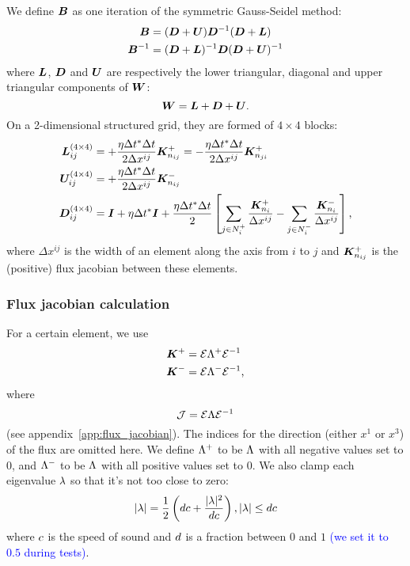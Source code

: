 \documentclass{article}
\newcommand{\todo}[1]{\textcolor{blue}{#1}}
\begin{document}
We define $\bm{B}$ as one iteration of the symmetric Gauss-Seidel method:
\begin{align}
    \bm{B}       &= (\bm{D} + \bm{U}) \bm{D}^{-1} (\bm{D} + \bm{L}) \\
    \bm{B}^{-1}  &= (\bm{D} + \bm{L})^{-1} \bm{D} (\bm{D} + \bm{U})^{-1}
\end{align}
where $\bm{L}$, $\bm{D}$ and $\bm{U}$ are respectively the lower triangular,
diagonal and upper triangular components of $\bm{W}$:
\begin{equation}
    \bm{W} = \bm{L} + \bm{D} + \bm{U}
    \text{.}
\end{equation}
On a 2-dimensional structured grid, they are formed of $4 \times 4$ blocks:
\begin{subequations}\label{eq:lower_upper_diag_blocks}
\begin{align}
    \bm{L}_{ij}^{(4\times4)} &= + \dfrac{\eta\Delta t^*\Delta t}{2\Delta x^{ij}} \bm{K}^+_{n_{ij}} \label{eq:Lij} 
    = - \dfrac{\eta\Delta t^*\Delta t}{2\Delta x^{ij}} \bm{K}^+_{n_{ji}}
    \\
    \bm{U}_{ij}^{(4\times4)} &= + \dfrac{\eta\Delta t^*\Delta t}{2\Delta x^{ij}} \bm{K}^-_{n_{ij}} \\
    \bm{D}_{ij}^{(4\times4)} &= \bm{I} + \eta\Delta t^*\bm{I} +
                    \dfrac{\eta\Delta t^*\Delta t}{2}
                     \left[ \sum_{j \in N_i^+} \dfrac{\bm{K}^+_{n_i}}{\Delta x^{ij}}
                    - \sum_{j \in N_i^-} \dfrac{\bm{K}^-_{n_i}}{\Delta x^{ij}} \right] \label{eq:Dij}
                   \text{,}
\end{align}
\end{subequations}
where $\Delta x^{ij}$ is the width of an element along the axis from $i$ to $j$ and $\bm{K}_{n_{ij}}^+$ is the (positive) flux jacobian between these elements.

\subsubsection{Flux jacobian calculation}
For a certain element, we use
\begin{align}
    \bm{K}^+ &= \mathcal{E} \Lambda^+ {{\mathcal{E}}^{-1}} \\
    \bm{K}^- &= \mathcal{E} \Lambda^- {{\mathcal{E}}^{-1}} 
    \text{,}
\end{align}
where
\begin{equation}
    \mathcal{J} = \mathcal{E}\Lambda{{\mathcal{E}}^{-1}}
\end{equation}
(see appendix~\ref{app:flux_jacobian}).
The indices for the direction (either $x^1$ or $x^3$) of the flux are omitted here.
We define $\Lambda^+$ to be $\Lambda$ with all negative values set to $0$, and
$\Lambda^-$ to be $\Lambda$ with all positive values set to $0$. We also clamp each eigenvalue $\lambda$ so that it's not too close to zero:
\begin{equation}
    |\lambda| = \dfrac{1}{2}\left(dc + \dfrac{|\lambda|^2}{dc}\right), |\lambda| \le dc
\end{equation}
where $c$ is the speed of sound and $d$ is a fraction between $0$ and $1$
 \todo{(we set it to $0.5$ during tests)}.
\end{document}
